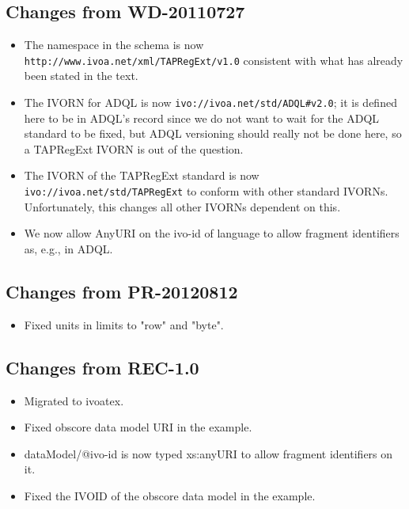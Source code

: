 \documentclass{ivoa}
\begin{document}
\subsection{Changes from WD-20110727}

\label{changes-20110727}

\begin{itemize}

\item The namespace in the schema is now \nolinkurl{http://www.ivoa.net/xml/TAPRegExt/v1.0} consistent with what has already been stated in the text.{}

\item The IVORN for ADQL is now \nolinkurl{ivo://ivoa.net/std/ADQL\#v2.0}; it is defined here to be in ADQL's record since we do not want to wait for the ADQL standard to be fixed, but ADQL versioning should really not be done here, so a TAPRegExt IVORN is out of the question.{}

\item The IVORN of the TAPRegExt standard is now \texttt{ivo://ivoa.net/std/TAPRegExt} to conform with other standard IVORNs.  Unfortunately, this changes
all other IVORNs dependent on this.{}

\item We now allow AnyURI on the ivo-id of language to allow fragment identifiers as, e.g., in ADQL.{}

\end{itemize}


\subsection{Changes from PR-20120812}

\label{changes-20120208}

\begin{itemize}

\item Fixed units in limits to "row" and "byte".{}

\end{itemize}

\subsection{Changes from REC-1.0}

\label{changes-rec-1.0}

\begin{itemize}

\item Migrated to ivoatex.
\item Fixed obscore data model URI in the example.
\item dataModel/@ivo-id is now typed xs:anyURI
to allow fragment identifiers on it.{}
\item Fixed the IVOID of the obscore data model in the example.{}


\end{itemize}


\end{document}
